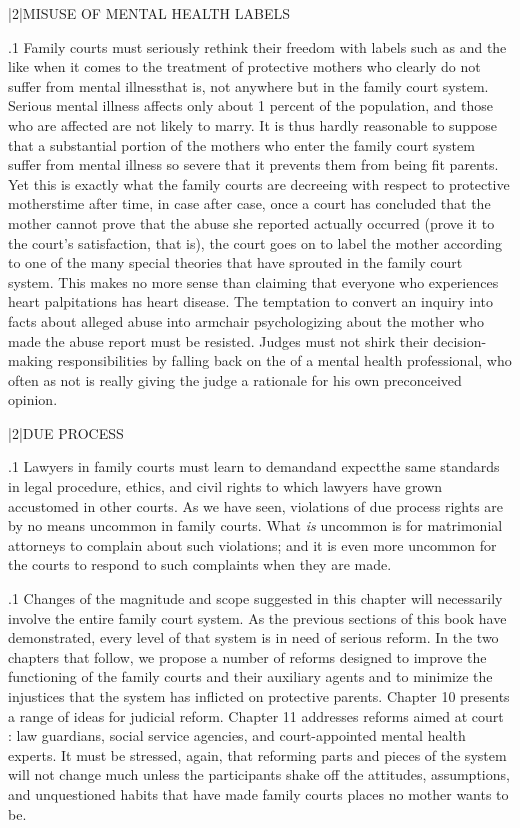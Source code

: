 \documentclass[11pt, twoside]{article}
\begin{document}
{\s|2|{MISUSE OF MENTAL HEALTH LABELS}

\p.1{%
\noindent{}Family courts must seriously rethink their freedom with labels such as
  and the like when it comes to
the treatment of protective mothers who clearly do not suffer from
mental illness\mdash{}that is, not anywhere but in the family court system. Serious
mental illness affects only about 1 percent of the population, and those
who are affected are not likely to marry. It is thus hardly reasonable to
suppose that a substantial portion of the mothers who enter the family
court system suffer from mental illness so severe that it prevents them
from being fit parents. Yet this is exactly what the family courts are decreeing with respect to protective mothers\mdash{}time after time, in case after
case, once a court has concluded that the mother cannot prove that the
abuse she reported actually occurred (prove it to the court’s satisfaction,
that is), the court goes on to label the mother  according to one of
the many special theories that have sprouted in the family court system.
This makes no more sense than claiming that everyone who experiences
heart palpitations has heart disease. The temptation to convert an inquiry into facts about alleged abuse into armchair psychologizing about
the mother who made the abuse report must be resisted. Judges must
not shirk their decision-making responsibilities by falling back on the
 of a mental health professional, who often as not is really
giving the judge a rationale for his own preconceived opinion.
}%


\s|2|{DUE PROCESS}

\p.1{%
\noindent{}Lawyers in family courts must learn to demand\mdash{}and expect\mdash{}the same
standards in legal procedure, ethics, and civil rights to which lawyers
have grown accustomed in other courts. As we have seen, violations of
due process rights are by no means uncommon in family courts. What
\textit{is} uncommon is for matrimonial attorneys to complain about such violations; and it is even more uncommon for the courts to respond to such
complaints when they are made.
}%

\p.1{%
Changes of the magnitude and scope suggested in this chapter will
necessarily involve the entire family court system. As the previous
sections of this book have demonstrated, every level of that system
is in need of serious reform. In the two chapters that follow, we propose a number of reforms designed to improve the functioning of the
family courts and their auxiliary agents and to minimize the injustices
that the system has inflicted on protective parents. Chapter 10 presents
a range of ideas for judicial reform. Chapter 11 addresses reforms
aimed at court : law guardians, social service agencies, and
court-appointed mental health experts. It must be stressed, again, that
reforming parts and pieces of the system will not change much unless
the participants shake off the attitudes, assumptions, and unquestioned
habits that have made family courts places no mother wants to be.
}%





}
\end{document}
